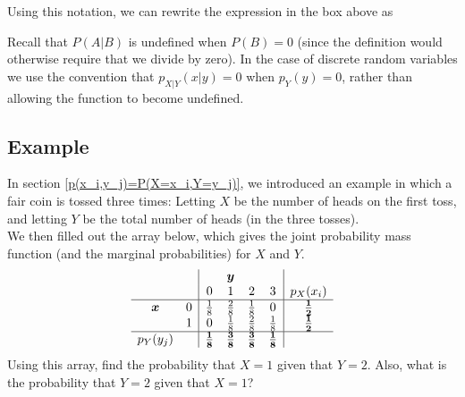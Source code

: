 \noindent Using this notation, we can rewrite the expression in the box above as
  
  	\bigskip
	
	\hfil{}
	\bigskip
	\bigskip
	
\noindent Recall that $P(A|B)$ is undefined when $P(B) = 0$ (since the definition would otherwise require that we divide by zero). In the case of discrete random variables we use the convention that $p_{X|Y}(x|y) = 0$ when $p_Y(y) = 0$, rather than allowing the function to become undefined. \label{sec27.2}



\subsection{Example} \label{ex27.4}
In section \ref{p(x_i,y_j)=P(X=x_i,Y=y_j)}, we introduced an example in which a fair coin is tossed three times: Letting $X$ be the number of heads on the first toss, and letting $Y$ be the total number of heads (in the three tosses). \\

\noindent We then filled out the array below, which gives the joint probability mass function (and the marginal probabilities) for $X$ and $Y$.
\[
\begin{array}{cc|cccc|c} 
&& \multicolumn{3}{c}{\boldsymbol{y}} & \\
&& \multicolumn{1}{c}{0} &  \multicolumn{1}{c}{1} &  \multicolumn{1}{c}{2} &  3 & p_X(x_i) \\ \hline
$$\boldsymbol{x}$$ \multirow{3}{*}{$$} &0& \frac{1}{8} & \frac{2}{8} & \frac{1}{8} & 0 &\boldsymbol{\frac{1}{2}}  \\ 
&1&  0                 & \frac{1}{8} & \frac{2}{8} & \frac{1}{8} & \boldsymbol{\frac{1}{2}} \\ \hline
\multicolumn{1}{c}{p_Y(y_j)} &&\boldsymbol{\frac{1}{8}}&\boldsymbol{\frac{3}{8}}&\boldsymbol{\frac{3}{8}}&\boldsymbol{\frac{1}{8}}
\end{array}
\]
Using this array, find the probability that $X = 1$ given that $Y = 2$. Also, what is the probability that $Y = 2$ given that $X = 1$? \\

